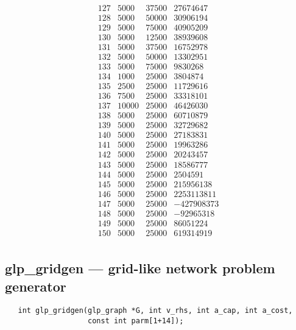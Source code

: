 \documentclass[11pt]{report}
\def\para#1{\noindent{\bf#1}}
\def\synopsis{\para{Synopsis}}
\begin{document}
$$\begin{array}{crrr}
127     & 5000  & 37500 &    27674647 \\
128     & 5000  & 50000 &    30906194 \\
129     & 5000  & 75000 &    40905209 \\
130     & 5000  & 12500 &    38939608 \\
131     & 5000  & 37500 &    16752978 \\
132     & 5000  & 50000 &    13302951 \\
133     & 5000  & 75000 &     9830268 \\
134     & 1000  & 25000 &     3804874 \\
135     & 2500  & 25000 &    11729616 \\
136     & 7500  & 25000 &    33318101 \\
137    & 10000  & 25000 &    46426030 \\
138     & 5000  & 25000 &    60710879 \\
139     & 5000  & 25000 &    32729682 \\
140     & 5000  & 25000 &    27183831 \\
141     & 5000  & 25000 &    19963286 \\
142     & 5000  & 25000 &    20243457 \\
143     & 5000  & 25000 &    18586777 \\
144     & 5000  & 25000 &     2504591 \\
145     & 5000  & 25000 &   215956138 \\
146     & 5000  & 25000 &  2253113811 \\
147     & 5000  & 25000 &  -427908373 \\
148     & 5000  & 25000 &   -92965318 \\
149     & 5000  & 25000 &    86051224 \\
150     & 5000  & 25000 &   619314919 \\
\end{array}
$$

\subsection{glp\_gridgen --- grid-like network problem generator}

\synopsis

\begin{verbatim}
   int glp_gridgen(glp_graph *G, int v_rhs, int a_cap, int a_cost,
                   const int parm[1+14]);
\end{verbatim}
\end{document}
